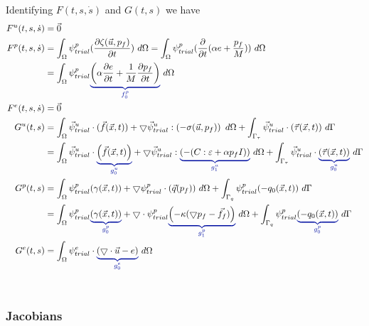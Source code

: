 Identifying $F(t,s,\dot{s})$ and $G(t,s)$ we have 
\begin{align}
F^u(t,s,\dot{s}) &= \vec{0} \\
%
F^p(t,s,\dot{s}) &= \int_{\Omega} \psi_{trial}^p (\frac{\partial \zeta 
(\vec{u},p_f)}{\partial t}) \ d\Omega = \int_{\Omega} \psi_{trial}^p 
(\frac{\partial}{\partial t}(\alpha e + \frac{p_f}{M})) \ d\Omega \\
&= \int_{\Omega} \psi_{trial}^p \eqnannotate{\left(\alpha \frac{\partial 
e}{\partial t} + \frac{1}{M} \frac{\partial p_f}{\partial t} \right)}{f_0^p} \ 
d\Omega \\
%
F^e(t,s,\dot{s}) &= \vec{0} \\
%
G^u(t,s) &= \int_{\Omega} \vec{\psi}_{trial}^u \cdot (\vec{f}(\vec{x},t)) + 
\bigtriangledown \vec{\psi}_{trial}^u : \left(-\sigma(\vec{u},p_f) \right) \ 
d\Omega + \int_{\Gamma_{\tau}} \vec{\psi}_{trial}^u \cdot 
(\vec{\tau}(\vec{x},t)) \ d\Gamma \\
&= \int_{\Omega} \vec{\psi}_{trial}^u \cdot 
\eqnannotate{\left(\vec{f}(\vec{x},t) \right)}{g_0^u} + 
\bigtriangledown \vec{\psi}_{trial}^u : 
\eqnannotate{\left(-(C:\varepsilon+\alpha p_f I)\right)}{g_1^u} \ 
d\Omega + \int_{\Gamma_{\tau}} \vec{\psi}_{trial}^u \cdot 
\eqnannotate{\left(\vec{\tau}(\vec{x},t) \right)}{g_0^u} \ 
d\Gamma \\
%
G^p(t,s) &= \int_{\Omega} \psi_{trial}^p (\gamma(\vec{x},t)) + \bigtriangledown 
\psi_{trial}^p \cdot (\vec{q}(p_f)) \ d\Omega + \int_{\Gamma_q} \psi_{trial}^p 
(-q_0(\vec{x},t)) \ d\Gamma \\
&= \int_{\Omega} \psi_{trial}^p 
\eqnannotate{\left(\gamma(\vec{x},t)\right)}{g_0^p} + \bigtriangledown \cdot 
\psi_{trial}^p  \eqnannotate{\left(-\kappa (\bigtriangledown p_f - \vec{f_f}) 
\right)}{g_1^p} \ d\Omega + \int_{\Gamma_q} \psi_{trial}^p 
\eqnannotate{ \left(-q_0(\vec{x},t) \right) }{g_0^p} \ d\Gamma \\
%
G^e(t,s) &= \int_{\Omega} \psi_{trial}^e \cdot 
\eqnannotate{\left(\bigtriangledown \cdot \vec{u} - e \right)}{g_0^e} 
\ d\Omega
\end{align} \\ 

\subsubsection{Jacobians}

